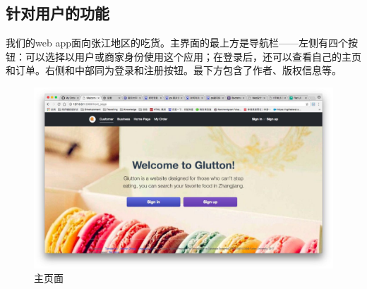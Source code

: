 \documentclass[12pt, oneside,a4paper]{article}
\begin{document}
 \subsection{针对用户的功能}
我们的web app面向张江地区的吃货。主界面的最上方是导航栏——左侧有四个按钮：可以选择以用户或商家身份使用这个应用；在登录后，还可以查看自己的主页和订单。右侧和中部同为登录和注册按钮。最下方包含了作者、版权信息等。
 \begin{figure}[H]
   \centering
     \includegraphics[width=6.00in]{cu-front.jpg}
     \caption{\small{主页面}}
  \end{figure}
\end{document}
